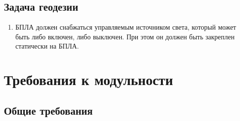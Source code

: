 \documentclass[utf8]{report}
\begin{document}
\subsection{Задача геодезии}
\begin{enumerate}
  \item БПЛА должен снабжаться управляемым источником света, который может быть либо включен, либо выключен. При этом он должен быть закреплен статически на БПЛА.
\end{enumerate}

\section{Требования к модульности}

\subsection{Общие требования}
\end{document}
